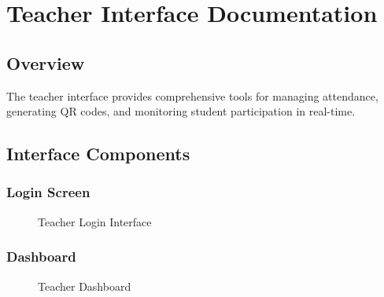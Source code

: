 \section{Teacher Interface Documentation}
\label{sec:teacher_interface}
\subsection{Overview}
The teacher interface provides comprehensive tools for managing attendance, generating QR codes, and monitoring student participation in real-time.

\subsection{Interface Components}
\subsubsection{Login Screen}
\begin{figure}[H]
    \centering
    \caption{Teacher Login Interface}
    \label{fig:teacher_login}
\end{figure}

\subsubsection{Dashboard}
\begin{figure}[H]
    \centering
    \caption{Teacher Dashboard}
    \label{fig:teacher_dashboard}
\end{figure}

